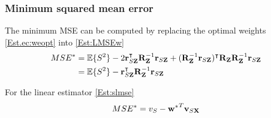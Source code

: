 \subsubsection{Minimum squared mean error}
 

{The minimum MSE can be computed by replacing the optimal weights \eqref{Est.ec:weopt} into
\eqref{Est:LMSEw}
\begin{align}
\label{Est:LMSEw2}
MSE^* &= \mathbb{E}\{S^2\} 
     - 2 {\bf r}_{S{\bf Z}}^\intercal {{\bf R}_{\bf Z}^{-1}} {\bf r}_{S{\bf Z}}  
     + ({{\bf R}_{\bf Z}^{-1}} {\bf r}_{S{\bf Z}} )^\intercal {\bf R}_{\bf Z} 
       {{\bf R}_{\bf Z}^{-1}} {\bf r}_{S{\bf Z}}    \nonumber\\
    &= \mathbb{E}\{S^2\} 
     - {\bf r}_{S{\bf Z}}^\intercal {{\bf R}_{\bf Z}^{-1}} {\bf r}_{S{\bf Z}}  
\end{align}}

For the linear estimator \eqref{Est:slmse}
\begin{align}
MSE^* = v_S - {{\bf w}^*}^T {\bf v}_{S{\bf X}} 
\end{align}

